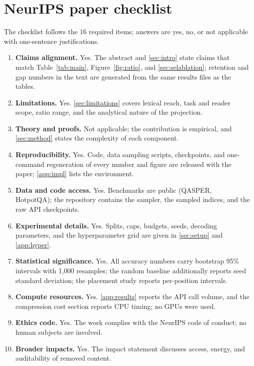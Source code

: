 \documentclass{article}
\begin{document}
\section{NeurIPS paper checklist}
\label{app:checklist}

The checklist follows the 16 required items; answers are yes, no, or not
applicable with one-sentence justifications.

\begin{enumerate}
\item \textbf{Claims alignment.} Yes. The abstract and
\autoref{sec:intro} state claims that match Table~\ref{tab:main},
Figure~\ref{fig:ratio}, and \autoref{sec:selablation}; retention and gap
numbers in the text are generated from the same results files as the
tables.
\item \textbf{Limitations.} Yes. \autoref{sec:limitations} covers
lexical reach, task and reader scope, ratio range, and the analytical
nature of the projection.
\item \textbf{Theory and proofs.} Not applicable; the contribution is
empirical, and \autoref{sec:method} states the complexity of each
component.
\item \textbf{Reproducibility.} Yes. Code, data sampling scripts,
checkpoints, and one-command regeneration of every number and figure are
released with the paper; \autoref{app:impl} lists the environment.
\item \textbf{Data and code access.} Yes. Benchmarks are public
(QASPER, HotpotQA); the repository contains the sampler, the sampled
indices, and the raw API checkpoints.
\item \textbf{Experimental details.} Yes. Splits, caps, budgets, seeds,
decoding parameters, and the hyperparameter grid are given in
\autoref{sec:setup} and \autoref{app:hyper}.
\item \textbf{Statistical significance.} Yes. All accuracy numbers carry
bootstrap 95\% intervals with 1{,}000 resamples; the random baseline
additionally reports seed standard deviation; the placement study
reports per-position intervals.
\item \textbf{Compute resources.} Yes. \autoref{app:results} reports the
API call volume, and the compression cost section reports CPU timing;
no GPUs were used.
\item \textbf{Ethics code.} Yes. The work complies with the NeurIPS code
of conduct; no human subjects are involved.
\item \textbf{Broader impacts.} Yes. The impact statement discusses
access, energy, and auditability of removed content.

\end{enumerate}
\end{document}
